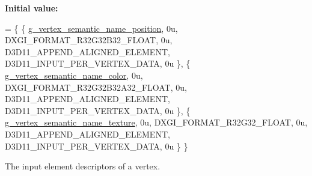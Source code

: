 {\bfseries Initial value\+:}
\begin{DoxyCode}
= \{
        \{ \hyperlink{namespacemage_1_1rendering_ae0a999915bd61d5a9d8addc04fe0646a}{g\_vertex\_semantic\_name\_position}, 0u, DXGI\_FORMAT\_R32G32B32\_FLOAT, 
         0u, D3D11\_APPEND\_ALIGNED\_ELEMENT, D3D11\_INPUT\_PER\_VERTEX\_DATA, 0u \},
        \{ \hyperlink{namespacemage_1_1rendering_a30c6185c03e23c5719a43ac9120d6f90}{g\_vertex\_semantic\_name\_color},    0u, DXGI\_FORMAT\_R32G32B32A32\_FLOAT, 
      0u, D3D11\_APPEND\_ALIGNED\_ELEMENT, D3D11\_INPUT\_PER\_VERTEX\_DATA, 0u \},
        \{ \hyperlink{namespacemage_1_1rendering_a6db7535ff83c660f8b7ce8eed50178c6}{g\_vertex\_semantic\_name\_texture},  0u, DXGI\_FORMAT\_R32G32\_FLOAT,     
        0u, D3D11\_APPEND\_ALIGNED\_ELEMENT, D3D11\_INPUT\_PER\_VERTEX\_DATA, 0u \}
    \}
\end{DoxyCode}
The input element descriptors of a vertex. 